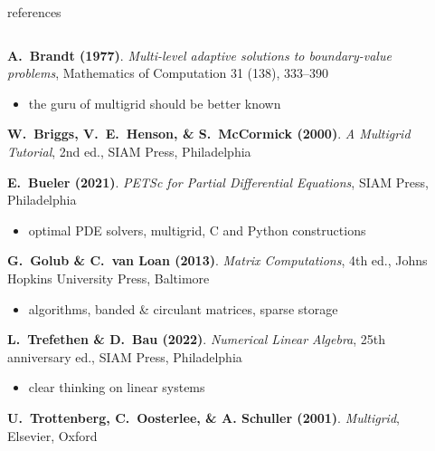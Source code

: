 \documentclass[10pt,
               svgnames,
               hyperref={colorlinks,citecolor=DeepPink4,linkcolor=FireBrick,urlcolor=Maroon},
               usepdftitle=false]{beamer}
\begin{document}
\begin{frame}{references}

\begin{columns}
\begin{column}{0.85\textwidth}
\begin{itemize}
{\small
\item[] \textbf{A.~Brandt (1977)}. \emph{Multi-level adaptive solutions to boundary-value problems}, Mathematics of Computation 31 (138), 333--390
    \begin{itemize}
    \item[$\circ$] the guru of multigrid should be better known
    \end{itemize}
\item[] \textbf{W.~Briggs, V.~E.~Henson, \& S.~McCormick (2000)}.  \emph{A Multigrid Tutorial}, 2nd ed., SIAM Press, Philadelphia
\item[] \textbf{E.~Bueler (2021)}. \emph{PETSc for Partial Differential Equations}, SIAM Press, Philadelphia
    \begin{itemize}
    \item[$\circ$] optimal PDE solvers, multigrid, C and Python constructions
    \end{itemize}
\item[] \textbf{G.~Golub \& C.~van Loan (2013)}. \emph{Matrix Computations}, 4th ed., Johns Hopkins University Press, Baltimore
    \begin{itemize}
    \item[$\circ$] algorithms, banded \& circulant matrices, sparse storage
    \end{itemize}
\item[] \textbf{L.~Trefethen \& D.~Bau (2022)}. \emph{Numerical Linear Algebra}, 25th anniversary ed., SIAM Press, Philadelphia
    \begin{itemize}
    \item[$\circ$] clear thinking on linear systems
    \end{itemize}
\item[] \textbf{U.~Trottenberg, C.~Oosterlee, \& A. Schuller (2001)}.  \emph{Multigrid}, Elsevier, Oxford
}
\end{itemize}
\end{column}
\begin{column}{0.15\textwidth}

\end{column}
\end{columns}
\end{frame}
\end{document}
